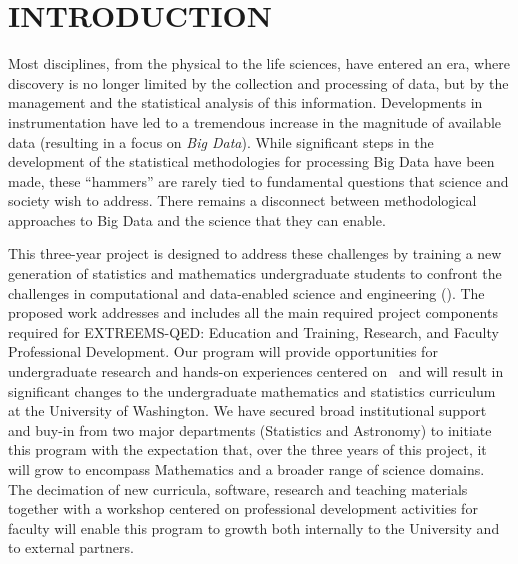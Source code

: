 \section{ INTRODUCTION}

Most disciplines, from the physical to the life sciences, have entered
an era, where discovery is no longer limited by the collection and
processing of data, but by the management and the statistical analysis
of this information. Developments in instrumentation have led to a
tremendous increase in the magnitude of available data (resulting in a
focus on \emph{Big Data}).  While significant steps in the development
of the statistical methodologies for processing Big Data have been
made, these ``hammers'' are rarely tied to fundamental questions that
science and society wish to address. There remains a disconnect
between methodological approaches to Big Data and the science that
they can enable.

This three-year project is designed to 
address these challenges by training a new generation of statistics
and mathematics undergraduate students to confront the challenges in
computational and data-enabled science and engineering (\cdse).  The
proposed work addresses and includes all the main required project
components required for EXTREEMS-QED: Education and Training,
Research, and Faculty Professional Development. Our program will
provide opportunities for undergraduate research and hands-on
experiences centered on \cdse\ and will result in significant changes
to the undergraduate mathematics and statistics curriculum at the
University of Washington. We have secured broad institutional support
and buy-in from two major departments (Statistics and Astronomy) to
initiate this program with the expectation that, over the three years
of this project, it will grow to encompass Mathematics and a broader
range of science domains. The decimation of new curricula, software,
research and teaching materials together with a workshop centered on
professional development activities for faculty will enable this
program to growth both internally to the University and to external
partners.





